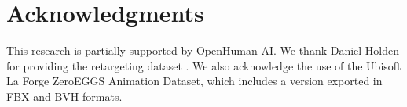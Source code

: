 %


\section*{Acknowledgments}

This research is partially supported by OpenHuman AI. We thank Daniel Holden for providing the retargeting dataset \citep{ghorbani2022zeroeggs}. We also acknowledge the use of the Ubisoft La Forge ZeroEGGS Animation Dataset, which includes a version exported in FBX and BVH formats.
